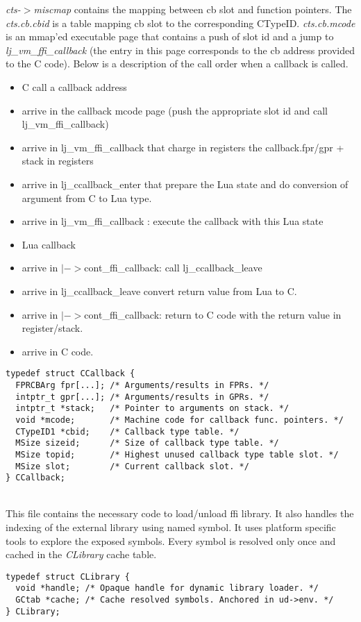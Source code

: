 \emph{cts-$>$miscmap} contains the mapping between cb slot and function
pointers. The \emph{cts.cb.cbid} is a table mapping cb slot to the corresponding
CTypeID. \emph{cts.cb.mcode} is an mmap'ed executable page that contains a push
of slot id and a jump to \emph{lj\_vm\_ffi\_callback} (the entry in this page
corresponds to the cb address provided to the C code). Below is a description
of the call order when a callback is called.
\begin{itemize}
	\item C call a callback address
	\item arrive in the callback mcode page (push the appropriate slot id and call lj\_vm\_ffi\_callback)
	\item arrive in lj\_vm\_ffi\_callback that charge in registers the callback.fpr/gpr + stack in registers
	\item arrive in lj\_ccallback\_enter that prepare the Lua state and do conversion of argument from C to Lua type.
	\item arrive in lj\_vm\_ffi\_callback : execute the callback with this Lua state
	\item Lua callback
	\item arrive in $|->$cont\_ffi\_callback: call lj\_ccallback\_leave
	\item arrive in lj\_ccallback\_leave convert return value from Lua to C.
	\item arrive in $|->$cont\_ffi\_callback: return to C code with the return value in register/stack.
	\item arrive in C code.
\end{itemize}
\begin{lstlisting}[style=CStyle]
typedef struct CCallback {
  FPRCBArg fpr[...]; /* Arguments/results in FPRs. */
  intptr_t gpr[...]; /* Arguments/results in GPRs. */
  intptr_t *stack;   /* Pointer to arguments on stack. */
  void *mcode;       /* Machine code for callback func. pointers. */
  CTypeID1 *cbid;    /* Callback type table. */
  MSize sizeid;      /* Size of callback type table. */
  MSize topid;       /* Highest unused callback type table slot. */
  MSize slot;        /* Current callback slot. */
} CCallback;
\end{lstlisting}
\\
This file contains the necessary code to load/unload ffi library. It also handles
the indexing of the external library using named symbol. It uses platform
specific tools to explore the exposed symbols. Every symbol is resolved only once
and cached in the \emph{CLibrary} cache table.
\\
\begin{lstlisting}[style=CStyle]
typedef struct CLibrary {
  void *handle; /* Opaque handle for dynamic library loader. */
  GCtab *cache; /* Cache resolved symbols. Anchored in ud->env. */
} CLibrary;
\end{lstlisting}